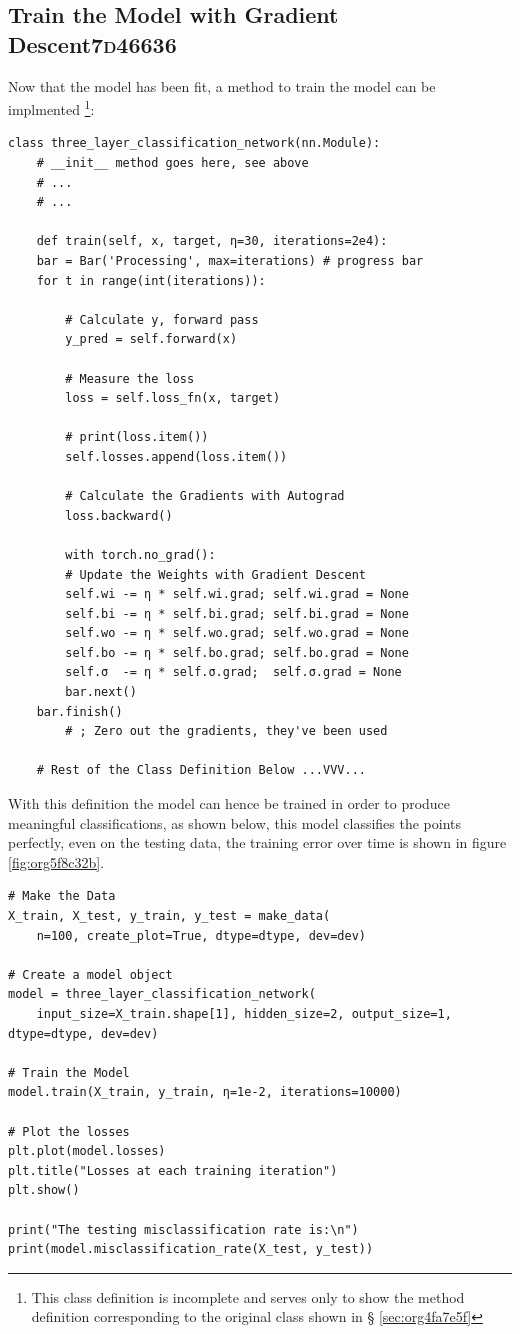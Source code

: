 \documentclass[a4paper,11pt,twoside]{article}
\begin{document}
\subsection{Train the Model with Gradient Descent\hfill{}\textsc{7d46636}}
\label{sec:orged1d681}
Now that the model has been fit, a method to train the model can be
implmented \footnote{This class definition is incomplete and serves only to show the
method definition corresponding to the original class shown in \S
\ref{sec:org4fa7e5f}}:
\begin{verbatim}
class three_layer_classification_network(nn.Module):
    # __init__ method goes here, see above
    # ...
    # ...

    def train(self, x, target, η=30, iterations=2e4):
	bar = Bar('Processing', max=iterations) # progress bar
	for t in range(int(iterations)):

	    # Calculate y, forward pass
	    y_pred = self.forward(x)

	    # Measure the loss
	    loss = self.loss_fn(x, target)

	    # print(loss.item())
	    self.losses.append(loss.item())

	    # Calculate the Gradients with Autograd
	    loss.backward()

	    with torch.no_grad():
		# Update the Weights with Gradient Descent 
		self.wi -= η * self.wi.grad; self.wi.grad = None
		self.bi -= η * self.bi.grad; self.bi.grad = None
		self.wo -= η * self.wo.grad; self.wo.grad = None
		self.bo -= η * self.bo.grad; self.bo.grad = None
		self.σ  -= η * self.σ.grad;  self.σ.grad = None
	    bar.next()
	bar.finish()
		# ; Zero out the gradients, they've been used

    # Rest of the Class Definition Below ...VVV...
\end{verbatim}

With this definition the model can hence be trained in order to
produce meaningful classifications, as shown below, this model classifies the
points perfectly, even on the testing data, the training error 
over time is shown in figure \ref{fig:org5f8c32b}.

\begin{verbatim}
# Make the Data
X_train, X_test, y_train, y_test = make_data(
    n=100, create_plot=True, dtype=dtype, dev=dev)

# Create a model object
model = three_layer_classification_network(
    input_size=X_train.shape[1], hidden_size=2, output_size=1, dtype=dtype, dev=dev)

# Train the Model
model.train(X_train, y_train, η=1e-2, iterations=10000)

# Plot the losses
plt.plot(model.losses)
plt.title("Losses at each training iteration")
plt.show()

print("The testing misclassification rate is:\n")
print(model.misclassification_rate(X_test, y_test))
\end{verbatim}
\end{document}
